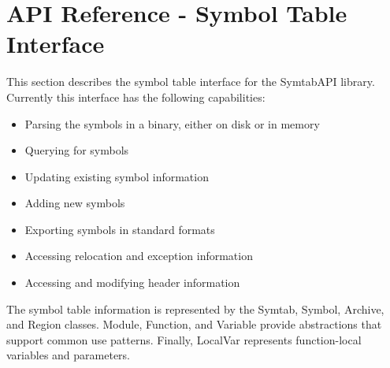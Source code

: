 \section{API Reference - Symbol Table Interface}
\label{sec:symtabAPI}

This section describes the symbol table interface for the SymtabAPI library. Currently this interface has the following capabilities:
\begin{itemize}
    \item Parsing the symbols in a binary, either on disk or in memory 
    \item Querying for symbols 
    \item Updating existing symbol information
    \item Adding new symbols 
    \item Exporting symbols in standard formats
    \item Accessing relocation and exception information
    \item Accessing and modifying header information
\end{itemize}

The symbol table information is represented by the Symtab, Symbol, Archive, and Region classes. Module, Function, and Variable provide abstractions that support common use patterns. Finally, LocalVar represents function-local variables and parameters. 











